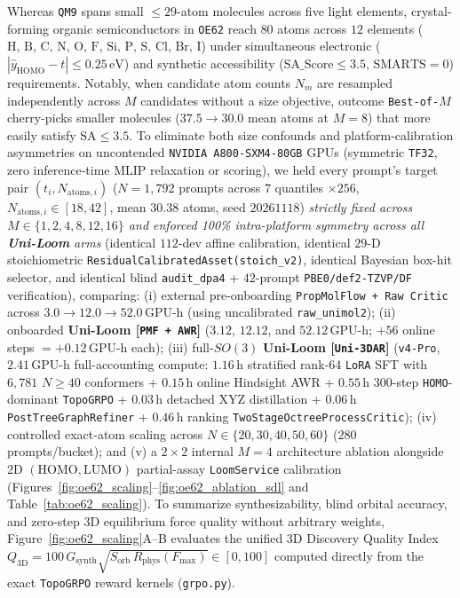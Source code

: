 \documentclass[11pt,a4paper]{article}
\begin{document}
Whereas \texttt{QM9} spans small $\le 29$-atom molecules across five light elements, crystal-forming organic semiconductors in \texttt{OE62} reach $80$ atoms across $12$ elements ($\text{H, B, C, N, O, F, Si, P, S, Cl, Br, I}$) under simultaneous electronic ($|\hat{y}_{\text{HOMO}} - t| \le 0.25\,\text{eV}$) and synthetic accessibility ($\text{SA\_Score} \le 3.5$, $\text{SMARTS} = 0$) requirements. Notably, when candidate atom counts $N_m$ are resampled independently across $M$ candidates without a size objective, outcome \texttt{Best-of-$M$} cherry-picks smaller molecules ($37.5 \to 30.0$ mean atoms at $M=8$) that more easily satisfy $\text{SA}\le 3.5$. To eliminate both size confounds and platform-calibration asymmetries on uncontended \texttt{NVIDIA A800-SXM4-80GB} GPUs (symmetric \texttt{TF32}, zero inference-time MLIP relaxation or scoring), we held every prompt's target pair $(t_i, N_{\text{atoms},i})$ ($N = 1{,}792$ prompts across $7$ quantiles $\times 256$, $N_{\text{atoms},i}\in[18,42]$, mean $30.38$ atoms, seed $20261118$) \emph{strictly fixed across $M\in\{1,2,4,8,12,16\}$ and enforced 100\% intra-platform symmetry across all \textbf{Uni-Loom} arms} (identical $112$-dev affine calibration, identical $29$-D stoichiometric \texttt{ResidualCalibratedAsset(stoich\_v2)}, identical Bayesian box-hit selector, and identical blind \texttt{audit\_dpa4} + $42$-prompt \texttt{PBE0/def2-TZVP/DF} verification), comparing: (i) external pre-onboarding \texttt{PropMolFlow + Raw Critic} \citep{zeng2026propmolflow} across $3.0 \to 12.0 \to 52.0\,\text{GPU-h}$ (using uncalibrated \texttt{raw\_unimol2}); (ii) onboarded \textbf{Uni-Loom [\texttt{PMF + AWR}]} ($3.12$, $12.12$, and $52.12\,\text{GPU-h}$; $+56$ online steps $= +0.12\,\text{GPU-h}$ each); (iii) full-$SO(3)$ \textbf{Uni-Loom [\texttt{Uni-3DAR}]} (\texttt{v4-Pro}, $2.41\,\text{GPU-h}$ full-accounting compute: $1.16\,\text{h}$ stratified rank-$64$ \texttt{LoRA} SFT with $6{,}781$ $N\ge 40$ conformers + $0.15\,\text{h}$ online Hindsight AWR + $0.55\,\text{h}$ $300$-step \texttt{HOMO}-dominant \texttt{TopoGRPO} + $0.03\,\text{h}$ detached XYZ distillation + $0.06\,\text{h}$ \texttt{PostTreeGraphRefiner} + $0.46\,\text{h}$ ranking \texttt{TwoStageOctreeProcessCritic}); (iv) controlled exact-atom scaling across $N\in\{20,30,40,50,60\}$ ($280$ prompts/bucket); and (v) a $2\times 2$ internal $M=4$ architecture ablation alongside $2\text{D}$ $(\text{HOMO},\text{LUMO})$ partial-assay \texttt{LoomService} calibration (Figures~\ref{fig:oe62_scaling}--\ref{fig:oe62_ablation_sdl} and Table~\ref{tab:oe62_scaling}). To summarize synthesizability, blind orbital accuracy, and zero-step 3D equilibrium force quality without arbitrary weights, Figure~\ref{fig:oe62_scaling}A--B evaluates the unified 3D Discovery Quality Index $Q_{\text{3D}} = 100\,G_{\text{synth}}\sqrt{S_{\text{orb}}\,R_{\text{phys}}(F_{\max})} \in [0, 100]$ computed directly from the exact \texttt{TopoGRPO} reward kernels (\texttt{grpo.py}).
\end{document}
